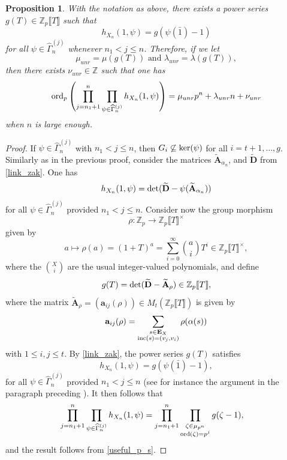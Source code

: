 \documentclass[11pt]{amsart}
\newtheorem{proposition}[theorem]{Proposition}
\numberwithin{equation}{section}
\theoremstyle{remark}
\theoremstyle{definition}
\begin{document}
\begin{proposition} \label{unr_i}
With the notation as above, there exists a power series $g(T) \in \mathbb{Z}_{p}\llbracket T\rrbracket$ such that
$$h_{X_{n}}(1,\psi) = g(\psi(\bar{1}) - 1) $$
for all $\psi \in \widehat{\Gamma}_{n}^{(j)}$ whenever $n_{1}<j\le n$.  Therefore, if we let 
$$\mu_{unr} = \mu(g(T)) \text{ and } \lambda_{unr} = \lambda(g(T)),$$ 
then there exists $\nu_{unr} \in \mathbb{Z}$ such that one has
$${\rm ord}_{p} \left(\prod_{j=n_{1}+1}^{n} \prod_{\psi \in \widehat{\Gamma}_{n}^{(j)}} h_{X_{n}}(1,\psi) \right) = \mu_{unr} p^{n} + \lambda_{unr}n + \nu_{unr}$$
when $n$ is large enough.  
\end{proposition}
\begin{proof}
If $\psi \in \widehat{\Gamma}_{n}^{(j)}$ with $n_{1} < j \le n$, then $G_{i} \not \subseteq {\rm ker}(\psi)$ for all $i=t+1,\ldots,g$.  Similarly as in the previous proof, consider the matrices $\widetilde{\mathbf{A}}_{\alpha_{n}}$, and $\widetilde{\mathbf{D}}$ from \cref{link_zak}.  One has
$$h_{X_{n}}(1,\psi) = {\rm det}(\widetilde{\mathbf{D}} - \psi(\widetilde{\mathbf{A}}_{\alpha_{n}})) $$
for all $\psi \in \widehat{\Gamma}_{n}^{(j)}$ provided $n_{1} < j \le n$.  Consider now the group morphism
$$\rho:\mathbb{Z}_{p} \rightarrow \mathbb{Z}_{p}\llbracket T \rrbracket^{\times} $$
given by 
$$a \mapsto \rho(a) = (1+T)^{a} = \sum_{i=0}^{\infty}\binom{a}{i}T^{i} \in \mathbb{Z}_{p}\llbracket T \rrbracket^{\times}, $$
where the $\binom{X}{i}$ are the usual integer-valued polynomials, and define
$$g(T) = {\rm det}(\widetilde{\mathbf{D}} - \widetilde{\mathbf{A}}_{\rho}) \in \mathbb{Z}_{p}\llbracket T \rrbracket, $$
where the matrix $\widetilde{\mathbf{A}}_{\rho} = (\mathbf{a}_{ij}(\rho)) \in M_{t}(\mathbb{Z}_{p}\llbracket T \rrbracket)$ is given by
$$\mathbf{a}_{ij}(\rho) = \sum_{\substack{s \in \mathbf{E}_{X} \\ {\rm inc}(s) = (v_{j},v_{i})}} \rho(\alpha(s))$$
with $1 \le i,j \le t$.  By \cref{link_zak}, the power series $g(T)$ satisfies
$$h_{X_{n}}(1,\psi) = g(\psi(\bar{1}) - 1), $$
for all $\psi \in \widehat{\Gamma}_{n}^{(j)}$ provided $n_{1}< j \le n$ (see for instance the argument in the paragraph preceding \cite[Remark 5.1]{Sage/Vallieres:2022}).  It then follows that
\begin{equation*}
\begin{aligned}
\prod_{j=n_{1}+1}^{n} \prod_{\psi \in \widehat{\Gamma}_{n}^{(j)}} h_{X_{n}}(1,\psi) &= \prod_{j=n_{1}+1}^{n} \prod_{\substack{\zeta \in \mu_{p^{n}}\\{\rm ord}(\zeta) = p^{j}}}g(\zeta - 1), 
\end{aligned}
\end{equation*}
and the result follows from \cref{useful_p_s}.
\end{proof}
\end{document}
